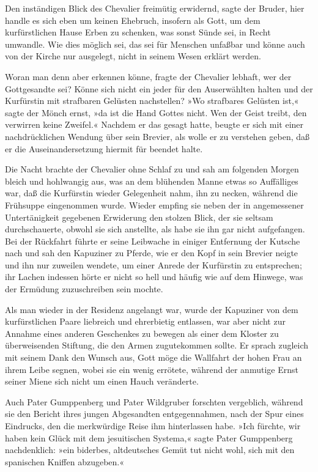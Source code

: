 Den inständigen Blick des Chevalier freimütig erwidernd, sagte der
Bruder, hier handle es sich eben um keinen Ehebruch, insofern als
Gott, um dem kurfürstlichen Hause Erben zu schenken, was sonst
Sünde sei, in Recht umwandle. Wie dies möglich sei, das sei für
Menschen unfaßbar und könne auch von der Kirche nur ausgelegt,
nicht in seinem Wesen erklärt werden.

Woran man denn aber erkennen könne, fragte der Chevalier lebhaft,
wer der Gottgesandte sei? Könne sich nicht ein jeder für den
Auserwählten halten und der Kurfürstin mit strafbaren Gelüsten
nachstellen? »Wo strafbares Gelüsten ist,« sagte der Mönch ernst,
»da ist die Hand Gottes nicht. Wen der Geist treibt, den verwirren
keine Zweifel.« Nachdem er das gesagt hatte, beugte er sich mit
einer nachdrücklichen Wendung über sein Brevier, als wolle er zu
verstehen geben, daß er die Auseinandersetzung hiermit für beendet
halte.

\pagenum{[114]} Die Nacht brachte der Chevalier ohne Schlaf zu und
sah am folgenden Morgen bleich und hohlwangig aus, was an dem
blühenden Manne etwas so Auffälliges war, daß die Kurfürstin wieder
Gelegenheit nahm, ihn zu necken, während die Frühsuppe eingenommen
wurde. Wieder empfing sie neben der in angemessener Untertänigkeit
gegebenen Erwiderung den stolzen Blick, der sie seltsam
durchschauerte, obwohl sie sich anstellte, als habe sie ihn gar
nicht aufgefangen. Bei der Rückfahrt führte er seine Leibwache in
einiger Entfernung der Kutsche nach und sah den Kapuziner zu
Pferde, wie er den Kopf in sein Brevier neigte und ihn nur zuweilen
wendete, um einer Anrede der Kurfürstin zu entsprechen; ihr Lachen
indessen hörte er nicht so hell und häufig wie auf dem Hinwege, was
der Ermüdung zuzuschreiben sein mochte.

Als man wieder in der Residenz angelangt war, wurde der Kapuziner
von dem kurfürstlichen Paare liebreich und ehrerbietig entlassen,
war aber nicht zur Annahme eines anderen Geschenkes zu bewegen als
einer dem Kloster zu überweisenden Stiftung, die den Armen
zugutekommen sollte. Er sprach zugleich mit seinem Dank den Wunsch
aus, Gott möge die Wallfahrt der hohen Frau an ihrem Leibe segnen,
wobei sie ein wenig errötete, während der anmutige Ernst seiner
Miene sich nicht um einen Hauch veränderte.

Auch Pater Gumppenberg und Pater Wildgruber forschten vergeblich,
während sie den Bericht ihres jungen Abgesandten entgegennahmen,
nach der Spur eines Eindrucks, den die merkwürdige Reise ihm
hinterlassen habe. »Ich fürchte, wir haben kein Glück mit dem
jesuitischen Systema,« sagte Pater Gumppenberg nachdenklich: »ein
biderbes, altdeutsches Gemüt tut nicht wohl, sich mit den
spanischen Kniffen abzugeben.«

